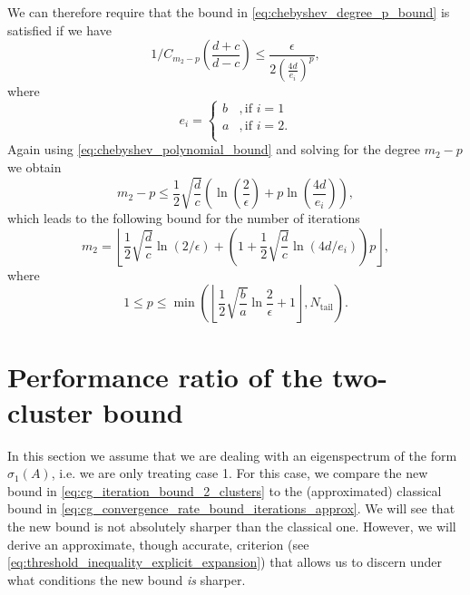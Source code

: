 We can therefore require that the bound in \cref{eq:chebyshev_degree_p_bound} is satisfied if we have
\[
    1/C_{m_2-p}\left(\frac{d+c}{d-c}\right) \leq \frac{\epsilon}{2\left( \frac{4d}{e_i}\right)^p},
\]
where
\[
    e_i = \begin{cases}
        b & , \text{if } i = 1  \\
        a & , \text{if } i = 2. \\
    \end{cases}
\]
Again using \cref{eq:chebyshev_polynomial_bound} and solving for the degree $m_2 - p$ we obtain
\[
    m_2 - p \leq \frac{1}{2}\sqrt{\frac{d}{c}}\left(\ln\left(\frac{2}{\epsilon}\right) + p \ln\left(\frac{4d}{e_i}\right)\right),
\]
which leads to the following bound for the number of iterations \cite[Equation 4.4]{cg_sharpened_convrate_Axelsson1976}
\begin{equation}
    m_2=\left\lfloor\frac{1}{2} \sqrt{\frac{d}{c}} \ln (2 / \epsilon)+\left(1+\frac{1}{2} \sqrt{\frac{d}{c}} \ln (4 d / e_i)\right) p\right\rfloor,
    \label{eq:cg_iteration_bound_2_clusters}
\end{equation}
where
\[
    1 \leq p \leq \min\left(\left\lfloor\frac{1}{2}\sqrt{\frac{b}{a}}\ln{\frac{2}{\epsilon}} + 1 \right\rfloor, N_{\text{tail}}\right).
\]

\section{Performance ratio of the two-cluster bound}\label{sec:performance_ratio}
In this section we assume that we are dealing with an eigenspectrum of the form $\sigma_1(A)$, i.e. we are only treating case 1. For this case, we compare the new bound in \cref{eq:cg_iteration_bound_2_clusters} to the (approximated) classical bound in \cref{eq:cg_convergence_rate_bound_iterations_approx}. We will see that the new bound is not absolutely sharper than the classical one. However, we will derive an approximate, though accurate, criterion (see \cref{eq:threshold_inequality_explicit_expansion}) that allows us to discern under what conditions the new bound \textit{is} sharper.

